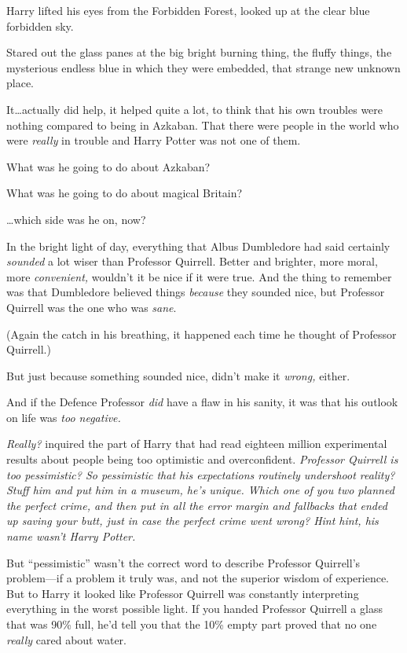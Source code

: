 Harry lifted his eyes from the Forbidden Forest, looked up at the clear blue forbidden sky.

Stared out the glass panes at the big bright burning thing, the fluffy things, the mysterious endless blue in which they were embedded, that strange new unknown place.

It…actually did help, it helped quite a lot, to think that his own troubles were nothing compared to being in Azkaban. That there were people in the world who were \emph{really} in trouble and Harry Potter was not one of them.

What was he going to do about Azkaban?

What was he going to do about magical Britain?

…which side was he on, now?

In the bright light of day, everything that Albus Dumbledore had said certainly \emph{sounded} a lot wiser than Professor Quirrell. Better and brighter, more moral, more \emph{convenient,} wouldn’t it be nice if it were true. And the thing to remember was that Dumbledore believed things \emph{because} they sounded nice, but Professor Quirrell was the one who was \emph{sane}.

(Again the catch in his breathing, it happened each time he thought of Professor Quirrell.)

But just because something sounded nice, didn’t make it \emph{wrong,} either.

And if the Defence Professor \emph{did} have a flaw in his sanity, it was that his outlook on life was \emph{too negative.}

\emph{Really?} inquired the part of Harry that had read eighteen million experimental results about people being too optimistic and overconfident. \emph{Professor Quirrell is too pessimistic? So pessimistic that his expectations routinely \emph{undershoot} reality? Stuff him and put him in a museum, he’s unique. Which one of you two planned the perfect crime, and \emph{then} put in all the error margin and fallbacks that ended up saving your butt, \emph{just in case} the perfect crime went wrong? Hint hint, his name wasn’t Harry Potter.}

But “pessimistic” wasn’t the correct word to describe Professor Quirrell’s problem—if a problem it truly was, and not the superior wisdom of experience. But to Harry it looked like Professor Quirrell was constantly interpreting everything in the worst possible light. If you handed Professor Quirrell a glass that was 90\% full, he’d tell you that the 10\% empty part proved that no one \emph{really} cared about water.

